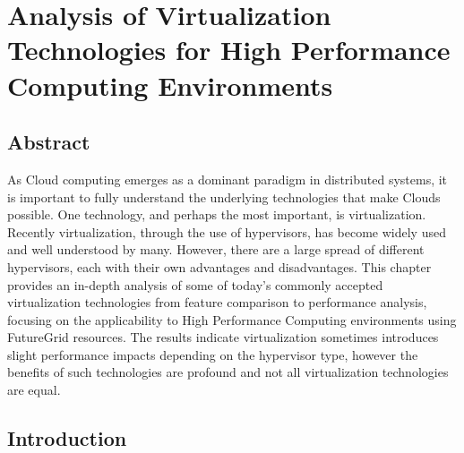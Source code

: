 


\chapter{Analysis of Virtualization Technologies for High Performance Computing Environments}
\label{chap:cloud2011}


\section{Abstract}


As Cloud computing emerges as a dominant paradigm in distributed systems, it is important to fully understand the underlying technologies that make Clouds possible.  One technology, and perhaps the most important, is virtualization. Recently virtualization, through the use of hypervisors, has become widely used and well understood by many.  However, there are a large spread of different hypervisors, each with their own advantages and disadvantages.  This chapter provides an in-depth analysis of some of today's commonly accepted virtualization technologies from feature comparison to performance analysis, focusing on the applicability to High Performance Computing environments using FutureGrid resources.  The results indicate virtualization sometimes introduces slight performance impacts depending on the hypervisor type, however the benefits of such technologies are profound and not all virtualization technologies are equal.




\section{Introduction}


